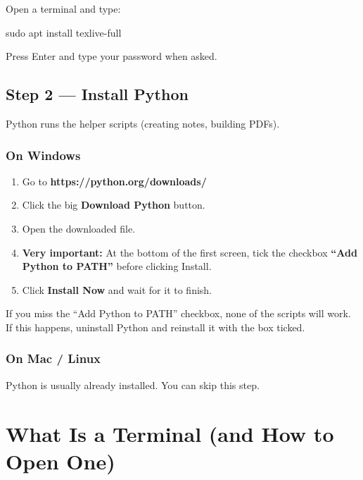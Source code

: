 \documentclass[a4paper,11pt]{article}
\begin{document}
\begin{stepbox}
Open a terminal and type:

{\monofont sudo apt install texlive-full}

Press Enter and type your password when asked.
\end{stepbox}

\subsection{Step 2 --- Install Python}

Python runs the helper scripts (creating notes, building PDFs).

\subsubsection{On Windows}

\begin{stepbox}
\begin{enumerate}[itemsep=6pt]
  \item Go to \textbf{https://python.org/downloads/}
  \item Click the big \textbf{Download Python} button.
  \item Open the downloaded file.
  \item \textbf{Very important:} At the bottom of the first screen, tick the checkbox \textbf{``Add Python to PATH''} before clicking Install.
  \item Click \textbf{Install Now} and wait for it to finish.
\end{enumerate}
\end{stepbox}

\begin{warnbox}
If you miss the ``Add Python to PATH'' checkbox, none of the scripts will work. If this happens, uninstall Python and reinstall it with the box ticked.
\end{warnbox}

\subsubsection{On Mac / Linux}

Python is usually already installed. You can skip this step.

\section{What Is a Terminal (and How to Open One)}
\label{sec:terminal}
\end{document}

